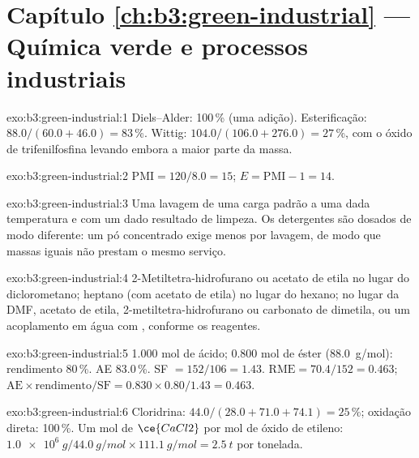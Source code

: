 \section*{Capítulo \ref{ch:b3:green-industrial} --- Química verde e processos industriais}

\begin{solution}{exo:b3:green-industrial:1}
Diels--Alder: 100\,\% (uma adição). Esterificação: $88.0/(60.0 + 46.0) = 83$\,\%. Wittig:
$104.0/(106.0 + 276.0) = 27$\,\%, com o óxido de trifenilfosfina levando embora a maior parte da massa.
\end{solution}

\begin{solution}{exo:b3:green-industrial:2}
$\mathrm{PMI} = 120/8.0 = 15$; $E = \mathrm{PMI} - 1 = 14$.
\end{solution}

\begin{solution}{exo:b3:green-industrial:3}
Uma lavagem de uma carga padrão a uma dada temperatura e com um dado resultado de limpeza. Os detergentes
são dosados de modo diferente: um pó concentrado exige menos por lavagem, de modo que massas iguais
não prestam o mesmo serviço.
\end{solution}

\begin{solution}{exo:b3:green-industrial:4}
2-Metiltetra-hidrofurano ou acetato de etila no lugar do diclorometano; heptano (com acetato
de etila) no lugar do hexano; no lugar da DMF, acetato de etila, 2-metiltetra-hidrofurano ou
carbonato de dimetila, ou um acoplamento em água com , conforme os
reagentes.
\end{solution}

\begin{solution}{exo:b3:green-industrial:5}
1.000 mol de ácido; 0.800 mol de éster (\qty{88.0}{g/mol}): rendimento 80\,\%. AE 83.0\,\%. SF $= 152/106 = 1.43$.
$\mathrm{RME} = 70.4/152 = 0.463$; $\mathrm{AE} \times \text{rendimento}/\mathrm{SF} = 0.830 \times 0.80/1.43 = 0.463$.
\end{solution}

\begin{solution}{exo:b3:green-industrial:6}
Cloridrina: $44.0/(28.0 + 71.0 + 74.1) = 25$\,\%; oxidação direta: 100\,\%. Um mol de $\ce{CaCl2}$ por mol de
óxido de etileno: $\qty{1.0e6}{g}/\qty{44.0}{g/mol} \times \qty{111.1}{g/mol} = \qty{2.5}{t}$ por tonelada.
\end{solution}

